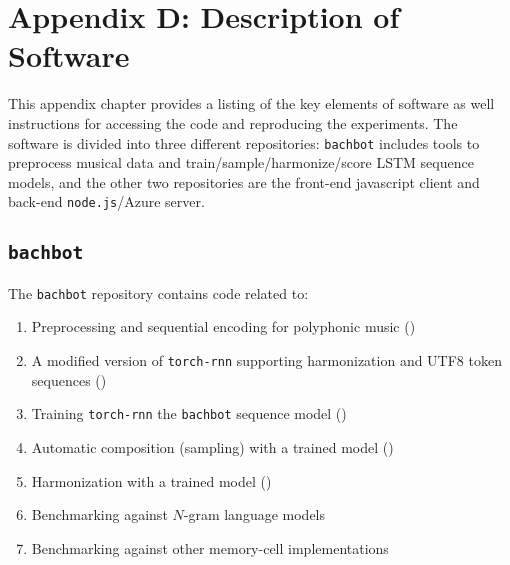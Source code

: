 \chapter{Appendix D: Description of Software}\label{sec:software}

\ifpdf
    \graphicspath{{Appendix4/Figs/Raster/}{Appendix4/Figs/PDF/}{Appendix4/Figs/}}
\else
    \graphicspath{{Appendix4/Figs/Vector/}{Appendix4/Figs/}}
\fi

This appendix chapter provides a listing of the key
elements of software as well instructions for accessing
the code and reproducing the experiments. The software
is divided into three different repositories:
\texttt{bachbot} includes tools to preprocess musical
data and train/sample/harmonize/score LSTM sequence
models, and the other two repositories are the
front-end javascript client and back-end
\texttt{node.js}/Azure server.

\section{\texttt{bachbot}}

The \texttt{bachbot} repository contains code related to:
\begin{enumerate}
    \item Preprocessing and sequential encoding for polyphonic music ()
    \item A modified version of \texttt{torch-rnn} supporting harmonization and
        UTF8 token sequences ()
    \item Training \texttt{torch-rnn} the \texttt{bachbot} sequence model ()
    \item Automatic composition (\ie sampling) with a trained model ()
    \item Harmonization with a trained model ()
    \item Benchmarking against $N$-gram language models 
    \item Benchmarking against other memory-cell implementations 
\end{enumerate}

